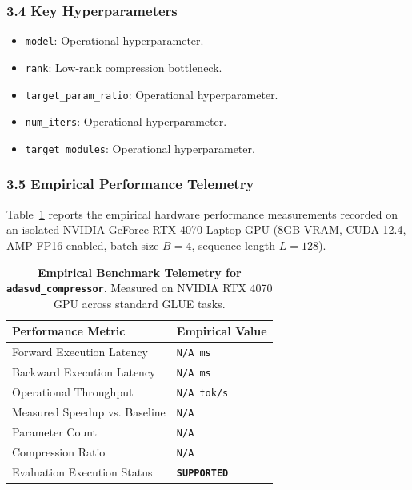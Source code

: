 \subsubsection*{3.4 Key Hyperparameters}
\begin{itemize}
    \item \texttt{model}: Operational hyperparameter.
    \item \texttt{rank}: Low-rank compression bottleneck.
    \item \texttt{target\_param\_ratio}: Operational hyperparameter.
    \item \texttt{num\_iters}: Operational hyperparameter.
    \item \texttt{target\_modules}: Operational hyperparameter.
\end{itemize}

\subsubsection*{3.5 Empirical Performance Telemetry}
Table~\ref{tab:telemetry_adasvd\_compressor} reports the empirical hardware performance measurements recorded on an isolated NVIDIA GeForce RTX 4070 Laptop GPU (8GB VRAM, CUDA 12.4, AMP FP16 enabled, batch size $B=4$, sequence length $L=128$).

\begin{table}[h]
\centering
\small
\caption{\textbf{Empirical Benchmark Telemetry for \texttt{adasvd\_compressor}}. Measured on NVIDIA RTX 4070 GPU across standard GLUE tasks.}
\label{tab:telemetry_adasvd\_compressor}
\begin{tabularx}{\columnwidth}{lX}
\toprule
\textbf{Performance Metric} & \textbf{Empirical Value} \\
\midrule
Forward Execution Latency & \texttt{N/A ms} \\
Backward Execution Latency & \texttt{N/A ms} \\
Operational Throughput & \texttt{N/A tok/s} \\
Measured Speedup vs. Baseline & \texttt{N/A} \\
Parameter Count & \texttt{N/A} \\
Compression Ratio & \texttt{N/A} \\
Evaluation Execution Status & \textbf{\texttt{SUPPORTED}} \\
\bottomrule
\end{tabularx}
\end{table}

